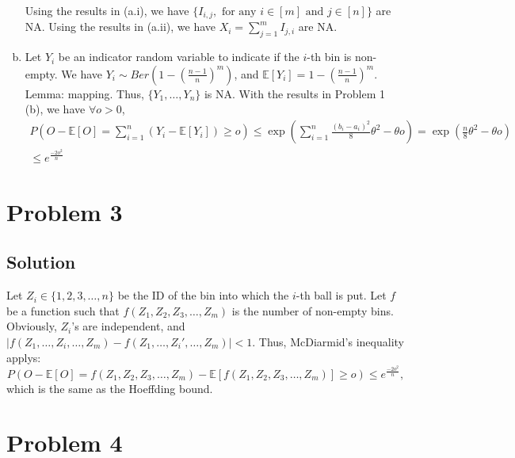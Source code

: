 \documentclass[11pt]{report}
\newcommand{\E}[1]{\mathbb{E}\left[#1\right]}
\begin{document}
\begin{enumerate}[(a)]
  Using the results in (a.i), we have $\{I_{i,j},\text{ for any }i \in [m] \text{ and }j \in [n]\}$ are NA. Using the results in (a.ii), we have $X_i = \sum_{j=1}^{m} I_{j,i}$ are NA.
  \item Let $Y_i$ be an indicator random variable to indicate if the $i$-th bin is non-empty. We have $Y_i \sim Ber(1-(\frac{n-1}{n})^m)$, and $\E{Y_i} = 1-(\frac{n-1}{n})^m$. Lemma: mapping. Thus, $\{Y_1, \dots, Y_n\}$ is NA. With the results in Problem 1 (b), we have $\forall o > 0$,
  \begin{multline*}
    P\left(O-\E{O} = \sum_{i=1}^{n} (Y_i - \E{Y_i}) \geq o \right) \leq \exp\left(\sum_{i=1}^{n} \frac{(b_i-a_i)^2}{8}\theta^2 - \theta o \right) = \exp\left(\frac{n}{8} \theta^2 - \theta o \right)\\ \leq e^{\frac{-2 o^2}{n}}
  \end{multline*}
\end{enumerate}
\section*{Problem 3}
\subsection*{Solution}
Let $Z_i \in \{1,2,3, \dots, n\}$ be the ID of the bin into which the $i$-th ball is put. Let $f$ be a function such that $f(Z_1, Z_2, Z_3, \dots, Z_m)$ is the number of non-empty bins. Obviously, $Z_i$'s are independent, and $\left|f(Z_1, \dots, Z_i, \dots, Z_m) - f(Z_1, \dots, Z_i', \dots, Z_m)\right| < 1$. Thus, McDiarmid's inequality applys:
\[
  P(O-\E{O} = f(Z_1, Z_2, Z_3, \dots, Z_m) - \E{f(Z_1, Z_2, Z_3, \dots, Z_m)} \geq o) \leq e^\frac{-2 o^2}{n},
\]
which is the same as the Hoeffding bound.
\section*{Problem 4}
\end{document}
